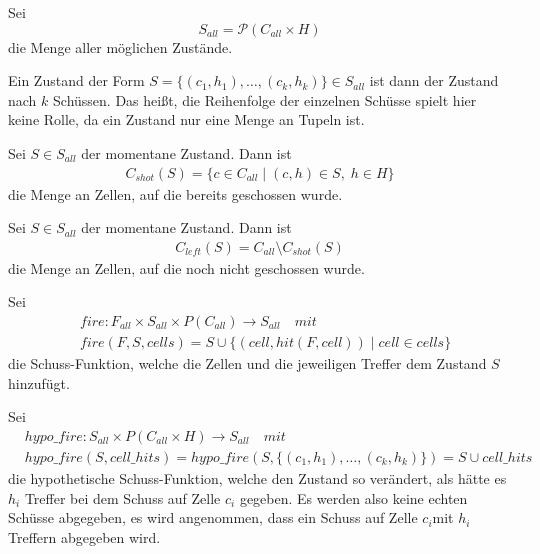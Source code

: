 \documentclass[a4paper,12pt]{llncs}
\numberwithin{equation}{section}
\begin{document}
\begin{definition}
Sei
\[
S_{all}=\mathscr{P}(C_{all}\times H)
\]
die Menge aller möglichen Zustände.

Ein Zustand der Form $S=\{(c_1, h_1), \dots , (c_k, h_k)\}\in S_{all}$ ist dann der Zustand nach $k$ Schüssen.
Das heißt, die Reihenfolge der einzelnen Schüsse spielt hier keine Rolle, da ein Zustand nur eine Menge an Tupeln ist.
\end{definition}

\begin{definition}
Sei $S\in S_{all}$ der momentane Zustand.
Dann ist
\begin{align}
C_{shot}(S)=\{c \in C_{all} \mid (c,h) \in S, \; h \in H\}
\end{align}
 die Menge an Zellen, auf die bereits geschossen wurde.
\end{definition}

\begin{definition}
Sei $S\in S_{all}$ der momentane Zustand.
Dann ist 
\begin{align}
C_{left}(S)=C_{all} \setminus C_{shot}(S)
\end{align}
die Menge an Zellen, auf die noch nicht geschossen wurde.
\end{definition}

\begin{definition}
Sei
\begin{align}
&fire:F_{all}\times S_{all}\times P(C_{all}) \rightarrow S_{all} \quad mit \nonumber\\
&fire(F, S, cells)=S \cup \{(cell,hit(F, cell)) \mid cell \in cells\}  \nonumber
\end{align}
die Schuss-Funktion, welche die Zellen und die jeweiligen Treffer dem Zustand $S$ hinzufügt.
\end{definition}

\begin{definition}
Sei
\begin{align}
&hypo\_fire:S_{all}\times P(C_{all}\times H) \rightarrow S_{all} \quad mit \nonumber\\
&hypo\_fire(S, cell\_hits)=hypo\_fire(S, \{(c_1,h_1), \dots, (c_k, h_k)\})=S \cup cell\_hits \nonumber
\end{align}
die hypothetische Schuss-Funktion, welche den Zustand so verändert, als hätte es $h_i$ Treffer bei dem Schuss auf Zelle $c_i$ gegeben. Es werden also keine echten Schüsse abgegeben, es wird angenommen, dass ein Schuss auf Zelle $c_i$mit $h_i$ Treffern abgegeben wird.
\end{definition}
\end{document}
